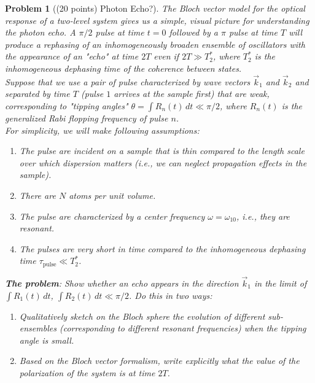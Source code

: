 \documentclass[UTF8,10pt,a4paper]{article}
\theoremstyle{Problem}
\newtheorem{prob}{Problem}
\theoremstyle{Solution}
\begin{document}
\thispagestyle{FirstPageStyle}
\begin{prob}[(20 points) Photon Echo?]
    The Bloch vector model for the optical response of a two-level system gives us a simple, visual picture for understanding the photon echo. A $\pi/2$ pulse at time $t=0$ followed by a $\pi$ pulse at time $T$ will produce a rephasing of an inhomogeneously broaden ensemble of oscillators with the appearance of an "echo" at time $2T$ even if $2T\gg T_2^*$, where $T_2^*$ is the inhomogeneous dephasing time of the coherence between states.\\
    Suppose that we use a pair of pulse characterized by wave vectors $\vec{k}_1$ and $\vec{k}_2$ and separated by time $T$ (pulse $1$ arrives at the sample first) that are weak, corresponding to "tipping angles" $\theta=\int R_n(t)\,dt\ll\pi/2$, where $R_n(t)$ is the generalized Rabi flopping frequency of pulse $n$.\\
    For simplicity, we will make following assumptions:
    \begin{enumerate}
        \item[(a)] The pulse are incident on a sample that is thin compared to the length scale over which dispersion matters (i.e., we can neglect propagation effects in the sample).
        \item[(b)] There are $N$ atoms per unit volume.
        \item[(c)] The pulse are characterized by a center frequency $\omega=\omega_{10}$, i.e., they are resonant.
        \item[(d)] The pulses are very short in time compared to the inhomogeneous dephasing time $\tau_{\text{pulse}}\ll T_2^*$.
    \end{enumerate}
    \textbf{The problem}:
    Show whether an echo appears in the direction $\vec{k}_1$ in the limit of $\int R_1(t)\,dt$, $\int R_2(t)\,dt\ll\pi/2$. Do this in two ways:
    \begin{enumerate}
        \item[(a)] Qualitatively sketch on the Bloch sphere the evolution of different sub-ensembles (corresponding to different resonant frequencies) when the tipping angle is small.
        \item[(b)] Based on the Bloch vector formalism, write explicitly what the value of the polarization of the system is at time $2T$.
    \end{enumerate}
\end{prob}
\end{document}
